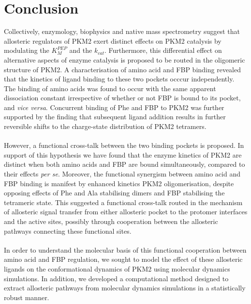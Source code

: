 \clearpage

 

\section{Conclusion}
Collectively, enzymology, biophysics and native mass spectrometry suggest that allosteric regulators of PKM2 exert distinct effects on PKM2 catalysis by modulating the $K_{M}^{PEP}$ and the $k_{cat}$. Furthermore, this differential effect on alternative aspects of enzyme catalysis is proposed to be routed in the oligomeric structure of PKM2.
%
%
A characterisation of amino acid and FBP binding revealed that the kinetics of ligand binding to these two pockets occcur independently. The binding of amino acids was found to occur with the same apparent dissociation constant irrespective of whether or not FBP is bound to its pocket, and \textit{vice versa}. Concurrent binding of Phe and FBP to PKM2 was further supported by the finding that subsequent ligand addition results in further reversible shifts to the charge-state distribution of PKM2 tetramers. 
\\\\
However, a functional cross-talk between the two binding pockets is proposed. In support of this hypothesis we have found that the enzyme kinetics of PKM2 are distinct when both amino acids and FBP are bound simultaneously, compared to their effects \textit{per se}. Moreover, the functional synergism between amino acid and FBP binding is manifest by enhanced kinetics PKM2 oligomerisation, despite opposing effects of Phe and Ala stabilising dimers and FBP stabilising the tetrameric state. This suggested a functional cross-talk routed in the mechanism of allosteric signal transfer from either allosteric pocket to the protomer interfaces and the active sites, possibly through cooperation between the allosteric pathways connecting these functional sites. 
\\\\
In order to understand the molecular basis of this functional cooperation between amino acid and FBP regulation, we sought to model the effect of these allosteric ligands on the conformational dynamics of PKM2 using molecular dynamics simulations. In addition, we developed a computational method designed to extract allosteric pathways from molecular dynamics simulations in a statistically robust manner.   




















